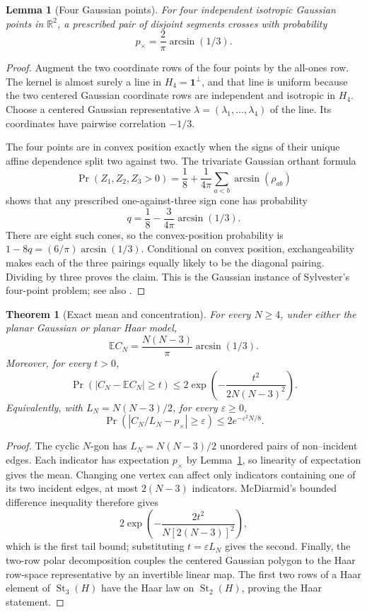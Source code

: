 \documentclass[11pt]{amsart}
\newtheorem{lemma}{Lemma}
\newtheorem{theorem}{Theorem}
\theoremstyle{remark}
\newcommand{\Ebb}{\mathbb{E}}
\newcommand{\Rbb}{\mathbb{R}}
\newcommand{\1}{\mathbf{1}}
\newcommand{\St}{\operatorname{St}}
\begin{document}
\begin{lemma}[Four Gaussian points]\label{lem:four-gaussian-cross}
For four independent isotropic Gaussian points in \(\Rbb^2\), a prescribed
pair of disjoint segments crosses with probability
\[
    p_\times=\frac2\pi\arcsin(1/3).
\]
\end{lemma}

\begin{proof}
Augment the two coordinate rows of the four points by the all-ones row.
The kernel is almost surely a line in \(H_4=\1^\perp\), and that line is
uniform because the two centered Gaussian coordinate rows are independent
and isotropic in \(H_4\).  Choose a centered Gaussian representative
\(\lambda=(\lambda_1,\ldots,\lambda_4)\) of the line.  Its coordinates have
pairwise correlation \(-1/3\).

The four points are in convex position exactly when the signs of their
unique affine dependence split two against two.  The trivariate Gaussian
orthant formula
\[
 \Pr(Z_1,Z_2,Z_3>0)
 =\frac18+\frac1{4\pi}\sum_{a<b}\arcsin(\rho_{ab})
\]
shows that any prescribed one-against-three sign cone has probability
\[
 q=\frac18-\frac3{4\pi}\arcsin(1/3).
\]
There are eight such cones, so the convex-position probability is
\(1-8q=(6/\pi)\arcsin(1/3)\).  Conditional on convex position, exchangeability
makes each of the three pairings equally likely to be the diagonal pairing.
Dividing by three proves the claim.  This is the Gaussian instance of
Sylvester's four-point problem; see also \cite{FrickNewmanPegden}.
\end{proof}

\begin{theorem}[Exact mean and concentration]\label{thm:planar-crossings}
For every \(N\ge4\), under either the planar Gaussian or planar Haar model,
\[
 \Ebb C_N
 =\frac{N(N-3)}{\pi}\arcsin(1/3).
\]
Moreover, for every \(t>0\),
\[
 \Pr\!\left(\left|C_N-\Ebb C_N\right|\ge t\right)
 \le
 2\exp\!\left(-\frac{t^2}{2N(N-3)^2}\right).
\]
Equivalently, with \(L_N=N(N-3)/2\), for every \(\varepsilon\ge0\),
\[
 \Pr\!\left(\left|C_N/L_N-p_\times\right|\ge\varepsilon\right)
 \le 2e^{-\varepsilon^2N/8}.
\]
\end{theorem}

\begin{proof}
The cyclic \(N\)-gon has \(L_N=N(N-3)/2\) unordered pairs of non--incident
edges.  Each indicator has expectation \(p_\times\) by
Lemma~\ref{lem:four-gaussian-cross}, so linearity of expectation gives the
mean.  Changing one vertex can affect only indicators containing one of its
two incident edges, at most \(2(N-3)\) indicators.  McDiarmid's bounded
difference inequality \cite{McDiarmid} therefore gives
\[
 2\exp\!\left(
 -\frac{2t^2}{N[2(N-3)]^2}\right),
\]
which is the first tail bound; substituting \(t=\varepsilon L_N\) gives the
second.  Finally, the two-row polar decomposition couples the centered
Gaussian polygon to the Haar row-space representative by an invertible
linear map.  The first two rows of a Haar element of \(\St_3(H)\) have the
Haar law on \(\St_2(H)\), proving the Haar statement.
\end{proof}
\end{document}

